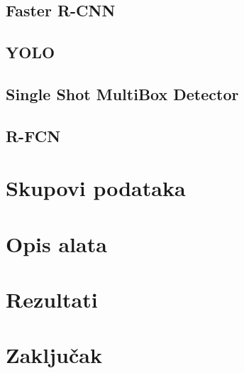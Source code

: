 \documentclass[times, utf8, diplomski]{fer}
\begin{document}
\section{Faster R-CNN}


\section{YOLO}


\section{Single Shot MultiBox Detector}


\section{R-FCN}


\chapter{Skupovi podataka}


\chapter{Opis alata}


\chapter{Rezultati}




\chapter{Zaključak}









\end{document}
